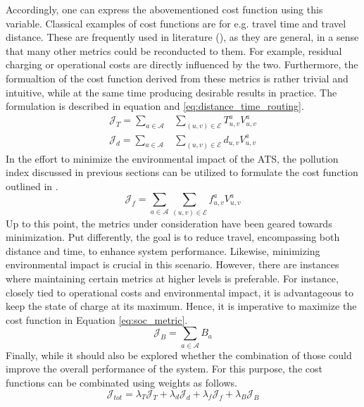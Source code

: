 Accordingly, one can express the abovementioned cost function using this variable. Classical examples of cost functions are for e.g. travel time and travel distance. These are frequently used in literature (\cite{7579135}), as they are general, in a sense that many other metrics could be reconducted to them. For example, residual charging or operational costs are directly influenced by the two. Furthermore, the formualtion of the cost function derived from these metrics is rather trivial and intuitive, while at the same time producing desirable results in practice. The formulation is described in equation  and \ref{eq:distance_time_routing}. \\
\begin{align}
	\mathcal{J}_T = \sum_{a \in \mathcal{A}} &\sum_{(u, v) \in \mathcal{E}} T^a_{ u,v} V^a_{u,v} \label{eq:travel_time_routing}\\
	\mathcal{J}_d = \sum_{a \in \mathcal{A}} &\sum_{(u, v) \in \mathcal{E}} d_{ u,v} V^a_{u,v}\label{eq:distance_time_routing}
\end{align} 
In the effort to minimize the environmental impact of the ATS, the pollution index discussed in previous sections can be utilized to formulate the cost function outlined in .
\begin{equation}
	\mathcal{J}_f =\sum_{a \in \mathcal{A}} \sum_{(u, v) \in \mathcal{E}} f^a_{ u,v} V^a_{u,v} 
	\label{eq:pollution_metric}
\end{equation} 
Up to this point, the metrics under consideration have been geared towards minimization. Put differently, the goal is to reduce travel, encompassing both distance and time, to enhance system performance. Likewise, minimizing environmental impact is crucial in this scenario. However, there are instances where maintaining certain metrics at higher levels is preferable. For instance, closely tied to operational costs and environmental impact, it is advantageous to keep the state of charge at its maximum. Hence, it is imperative to maximize the cost function in Equation \ref{eq:soc_metric}.
\begin{equation}
	\mathcal{J}_B =\sum_{a \in \mathcal{A}}  B_a 
	\label{eq:soc_metric}
\end{equation} 
Finally, while it should also be explored whether the combination of those could improve the overall performance of the system. For this purpose, the cost functions can be combinated using weights as follows.  
\begin{equation}
	\mathcal{J}_{tot} = \lambda_T\mathcal{J}_T +\lambda_d\mathcal{J}_d +\lambda_f\mathcal{J}_f +\lambda_B\mathcal{J}_B 
	\label{eq:combined_metrics}
\end{equation} \\
